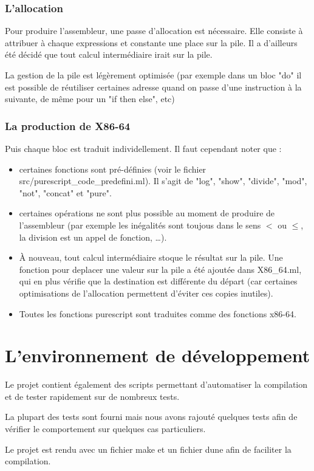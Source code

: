 \documentclass[12pt,a4paper,french]{article}
\begin{document}
\section*{L'allocation}
Pour produire l'assembleur, une passe d'allocation est nécessaire. Elle consiste à attribuer à chaque expressions et constante une place sur la pile. Il a d'ailleurs été décidé que tout calcul intermédiaire irait sur la pile.

La gestion de la pile est légèrement optimisée (par exemple dans un bloc "do" il est possible de réutiliser certaines adresse quand on passe d'une instruction à la suivante, de même pour un "if then else", etc)


\section*{La production de X86-64}
\noindent Puis chaque bloc est traduit individellement. Il faut cependant noter que :
\begin{itemize}
    \item certaines fonctions sont pré-définies (voir le fichier src/purescript\_code\_predefini.ml). Il s'agit de "log", "show", "divide", "mod", "not", "concat" et "pure".
    \item certaines opérations ne sont plus possible au moment de produire de l'assembleur (par exemple les inégalités sont toujous dans le sens $<$ ou $\le$, la division est un appel de fonction, \dots).
    \item À nouveau, tout calcul intermédiaire stoque le résultat sur la pile. Une fonction pour deplacer une valeur sur la pile a été ajoutée dans X86\_64.ml, qui en plus vérifie que la destination est différente du départ (car certaines optimisations de l'allocation permettent d'éviter ces copies inutiles).
    \item Toutes les fonctions purescript sont traduites comme des fonctions x86-64.
\end{itemize}


\newpage
\part*{L'environnement de développement}
Le projet contient également des scripts permettant d'automatiser la compilation et de tester rapidement sur de nombreux tests.

La plupart des tests sont fourni mais nous avons rajouté quelques tests afin de vérifier le comportement sur quelques cas particuliers.

Le projet est rendu avec un fichier make et un fichier dune afin de faciliter la compilation.
\end{document}
